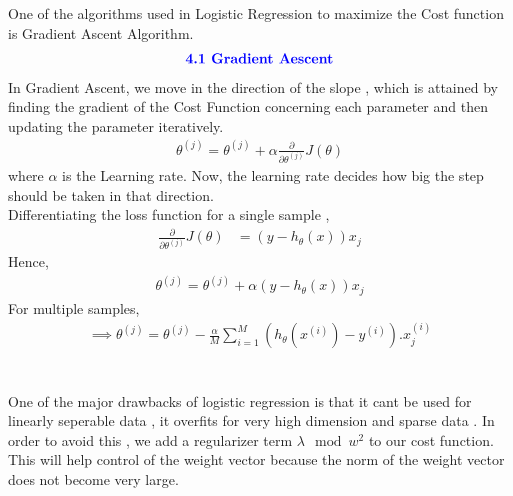 \documentclass[12pt,a4paper]{article}
\begin{document}
{\section{}

One of the algorithms used in Logistic Regression to maximize the Cost function is Gradient Ascent Algorithm.
\begin{align*}
   \textcolor{blue}{ \text{{\textbf{4.1 Gradient Aescent}}}}
\end{align*}
In Gradient Ascent, we move in the direction of the slope , which is attained by finding the gradient of the Cost Function concerning each parameter and then updating the parameter iteratively.
\begin{align*}
    \theta^{(j)} = \theta^{(j)} + \alpha \frac{\partial}{\partial\theta^{(j)}}J(\theta)
\end{align*}
where $\alpha$ is the Learning rate. Now, the learning rate decides how big the step should be taken in that direction.\\

Differentiating the loss function for a single sample ,
\begin{align*}
    \frac{\partial}{\partial\theta^{(j)}}J(\theta) &= (y-h_\theta(x))x_j
\end{align*}
Hence,
\begin{align*}
     \theta^{(j)} = \theta^{(j)} + \alpha (y-h_\theta(x))x_j
\end{align*}
For multiple samples,
\begin{align*}
\implies \theta^{(j)} = \theta^{(j)} - \frac{\alpha}{M}\displaystyle\sum_{i = 1}^{M}(h_\theta(x^{(i)}) - y^{(i)} ).x_j^{(i)}
\end{align*}


\section{}

One of the major drawbacks of logistic regression is that it cant be used for linearly seperable data , it overfits for very high dimension and sparse data . In order to avoid this , we add a regularizer term $\lambda \mod{w}^2$ to our cost function. This will help control of the weight vector because the norm of the weight vector does not become very large.

\section{}

}
\end{document}
